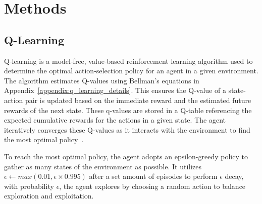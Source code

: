\documentclass{article}
\begin{document}
\section{Methods}



\subsection{Q-Learning}

Q-learning is a model-free, value-based reinforcement learning algorithm used to determine the optimal action-selection policy for an agent in a given environment. The algorithm estimates Q-values using Bellman's equations in Appendix~\ref{appendix:q_learning_details}. This ensures the Q-value of a state-action pair is updated based on the immediate reward and the estimated future rewards of the next state. These q-values are stored in a Q-table referencing the expected cumulative rewards for the actions in a given state. The agent iteratively converges these Q-values as it interacts with the environment to find the most optimal policy~\cite{watkins_technical_1992}.

To reach the most optimal policy, the agent adopts an epsilon-greedy policy to gather as many states of the environment as possible. It utilizes $\epsilon \leftarrow max(0.01, \epsilon \times 0.995)$ after a set amount of episodes to perform $\epsilon$ decay, with probability $\epsilon $, the agent explores by choosing a random action to balance exploration and exploitation.

\end{document}
